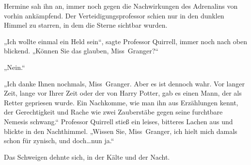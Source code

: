 Hermine sah ihn an, immer noch gegen die Nachwirkungen des Adrenalins von vorhin ankämpfend. Der Verteidigungsprofessor schien nur in den dunklen Himmel zu starren, in dem die Sterne sichtbar wurden.

„Ich wollte einmal ein Held sein“, sagte Professor Quirrell, immer noch nach oben blickend. „Können Sie das glauben, Miss~Granger?“

„Nein.“

„Ich danke Ihnen nochmals, Miss~Granger. Aber es ist dennoch wahr. Vor langer Zeit, lange vor Ihrer Zeit oder der von Harry Potter, gab es einen Mann, der als Retter gepriesen wurde. Ein Nachkomme, wie man ihn aus Erzählungen kennt, der Gerechtigkeit und Rache wie zwei Zauberstäbe gegen seine furchtbare Nemesis schwang.“
Professor Quirrell stieß ein leises, bitteres Lachen aus und blickte in den Nachthimmel.
„Wissen Sie, Miss~Granger, ich hielt mich damals schon für zynisch, und doch…nun ja.“

Das Schweigen dehnte sich, in der Kälte und der Nacht.

